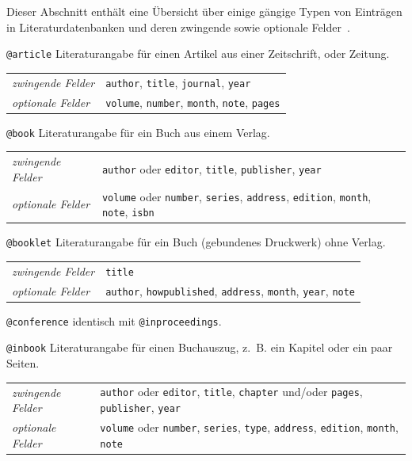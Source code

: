 \documentclass[a4paper,10pt,twoside]{scrbook}
\begin{document}
{Dieser Abschnitt enthält eine Übersicht über einige gängige Typen von Einträgen in Literaturdatenbanken und deren zwingende sowie optionale Felder~\cite{bibtexWikipediaWebseite,Wikibooks_LaTeX_Kompendium}.

\verb!@article! Literaturangabe für einen Artikel aus einer Zeitschrift, oder Zeitung.

\begin{tabular}{p{2.8cm}p{10cm}}
	 \textsl{zwingende Felder} & \texttt{author}, \texttt{title}, \texttt{journal}, \texttt{year}\\
	 \textsl{optionale Felder} & \texttt{volume}, \texttt{number}, \texttt{month}, \texttt{note}, \texttt{pages}\\
\end{tabular}

\verb!@book! Literaturangabe für ein Buch aus einem Verlag.

\begin{tabular}{p{2.8cm}p{10cm}}
	 \textsl{zwingende Felder} & \texttt{author} oder \texttt{editor}, \texttt{title}, \texttt{publisher}, \texttt{year}\\
	 \textsl{optionale Felder} & \texttt{volume} oder \texttt{number}, \texttt{series}, \texttt{address}, \texttt{edition}, \texttt{month}, \texttt{note}, \texttt{isbn} \\
\end{tabular}

\verb!@booklet! Literaturangabe für ein Buch (gebundenes Druckwerk) ohne Verlag.

\begin{tabular}{p{2.8cm}p{10cm}}
	 \textsl{zwingende Felder} & \texttt{title}\\
	 \textsl{optionale Felder} & \texttt{author}, \texttt{howpublished}, \texttt{address}, \texttt{month}, \texttt{year}, \texttt{note}\\
\end{tabular}

\verb!@conference! identisch mit \verb!@inproceedings!.

\verb!@inbook! Literaturangabe für einen Buchauszug, z.~B. 
ein Kapitel oder ein paar Seiten.

\begin{tabular}{p{2.8cm}p{10cm}}
	 \textsl{zwingende Felder} & \texttt{author} oder \texttt{editor}, \texttt{title}, \texttt{chapter} und/oder \texttt{pages}, \texttt{publisher}, \texttt{year}\\
	 \textsl{optionale Felder} & \texttt{volume} oder \texttt{number}, \texttt{series}, \texttt{type}, \texttt{address}, \texttt{edition}, \texttt{month}, \texttt{note}\\
\end{tabular}

}
\end{document}
